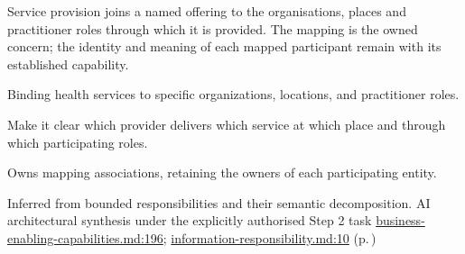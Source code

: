 Service provision joins a named offering to the organisations, places and practitioner roles through which it is provided. The mapping is the owned concern; the identity and meaning of each mapped participant remain with its established capability.



Binding health services to specific organizations, locations, and practitioner roles.



Make it clear which provider delivers which service at which place and through which participating roles.



Owns mapping associations, retaining the owners of each participating entity.


Inferred from bounded responsibilities and their semantic decomposition. AI architectural synthesis under the explicitly authorised Step 2 task \hyperref[evidence:e01893359d483acf]{business-enabling-capabilities.md:196}; \hyperref[evidence:be61392fefb4bb10]{information-responsibility.md:10}
 (p.\,\pageref{cap:bec-healthcare-service-definition})
